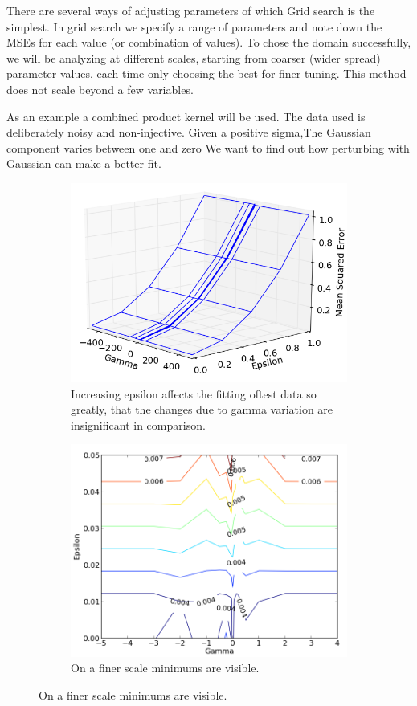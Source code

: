 \documentclass[12pt,notitlepage,twoside]{scrreprt}
\begin{document}
There are several ways of adjusting parameters of which Grid search is the simplest. In
grid search we specify a range of parameters and note down the MSEs for each value (or
combination of values). To chose the domain successfully, we will be analyzing at
different scales, starting from coarser (wider spread) parameter values, each time only
choosing the best for finer tuning. This method does not scale beyond a few variables.

As an example a combined product kernel will be used. The data used is deliberately noisy
and non-injective. Given a positive sigma,The Gaussian component varies
between one and zero
We want to find out how perturbing with Gaussian can make a better fit. 


\begin{figure}[h!]
\centering
\begin{subfigure}[b]{.49\textwidth}
  \centering
  \includegraphics[width=\linewidth]{figs/coarse_tune2.png}
  \caption{Increasing epsilon affects the fitting oftest data so greatly, that the changes
  due to gamma variation are insignificant in comparison.}
  \label{coarse}
\end{subfigure}
\begin{subfigure}[b]{.49\textwidth}
  \centering
  \includegraphics[width=0.9\linewidth]{figs/fine_tune_tr.png}
  \caption{On a finer scale minimums are visible.}
  \label{fine}
\end{subfigure}
\end{figure}
\end{document}
